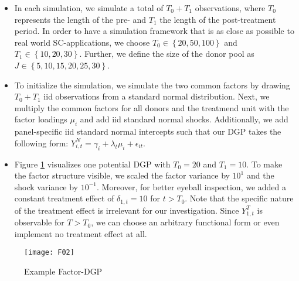\begin{itemize}
	\item In each simulation, we simulate a total of $T_0 + T_1$ observations, where $T_0$ represents the length of the pre- and $T_1$ the length of the post-treatment period. In order to have a simulation framework that is as close as possible to real world SC-applications, we choose $T_0 \in \left\lbrace 20,50,100\right\rbrace $ and $T_1 \in \left\lbrace 10,20,30\right\rbrace $. Further, we define the size of the donor pool as $J \in \left\lbrace 5,10,15,20,25,30\right\rbrace$.
	\item To initialize the simulation, we simulate the two common factors by drawing $T_0 + T_1$ \ac{iid}  observations from a standard normal distribution. Next, we multiply the common factors for all donors and the treatmend unit with the factor loadings $\mu_i$ and add \ac{iid} standard normal shocks. Additionally, we add panel-specific \ac{iid} standard normal intercepts such that our \ac{DGP} takes the following form: $Y_{i,t}^{N} = \gamma_i + \lambda_t \mu_i + \epsilon_{it}$. 
	\item Figure \ref{F_02} visualizes one potential \ac{DGP} with $T_0 = 20$ and $T_1 = 10$. To make the factor structure visible, we scaled the factor variance by $10^1$ and the shock variance by $10^{-1}$. Moreover, for better eyeball inspection, we added a constant treatment effect of $\delta_{1,t} = 10$ for $t > T_0$. Note that the specific nature of the treatment effect is irrelevant for our investigation. Since $Y_{1,t}^T$ is observable for $T>T_0$, we can choose an arbitrary functional form or even implement no treatment effect at all.
\end{itemize}
\phantom{space}
\begin{figure}[H]
	\centering
	\texttt{[image: F02]}
	\caption{Example Factor-\ac{DGP}}
	\label{F_02}
\end{figure}
	
